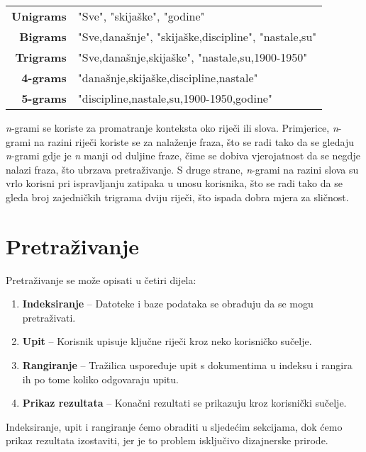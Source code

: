 \documentclass[11pt]{scrreprt}
\begin{document}
\begin{center}
  \begin{tabular}{rl}
    \textbf{Unigrams} & "Sve", "skijaške", "godine"                         \\
    \textbf{Bigrams}  & "Sve,današnje", "skijaške,discipline", "nastale,su" \\
    \textbf{Trigrams} & "Sve,današnje,skijaške", "nastale,su,1900-1950"     \\
    \textbf{4-grams}  & "današnje,skijaške,discipline,nastale"              \\
    \textbf{5-grams}  & "discipline,nastale,su,1900-1950,godine"            \\
  \end{tabular}
\end{center}

\textit{n}-grami se koriste za promatranje konteksta oko riječi ili slova. Primjerice, \textit{n}-grami na razini riječi koriste se za nalaženje fraza, što se radi tako da se gledaju \textit{n}-grami gdje je \textit{n} manji od duljine fraze, čime se dobiva vjerojatnost da se negdje nalazi fraza, što ubrzava pretraživanje. S druge strane, \textit{n}-grami na razini slova su vrlo korisni pri ispravljanju zatipaka u unosu korisnika, što se radi tako da se gleda broj zajedničkih trigrama dviju riječi, što ispada dobra mjera za sličnost.

\chapter{Pretraživanje}

Pretraživanje se može opisati u četiri dijela:

\begin{enumerate}
  \item \textbf{Indeksiranje} – Datoteke i baze podataka se obrađuju da se mogu pretraživati.
  \item \textbf{Upit} – Korisnik upisuje ključne riječi kroz neko korisničko sučelje.
  \item \textbf{Rangiranje} – Tražilica uspoređuje upit s dokumentima u indeksu i rangira ih po tome koliko odgovaraju upitu.
  \item \textbf{Prikaz rezultata} – Konačni rezultati se prikazuju kroz korisnički sučelje.
\end{enumerate}

Indeksiranje, upit i rangiranje ćemo obraditi u sljedećim sekcijama, dok ćemo prikaz rezultata izostaviti, jer je to problem isključivo dizajnerske prirode.
\end{document}
